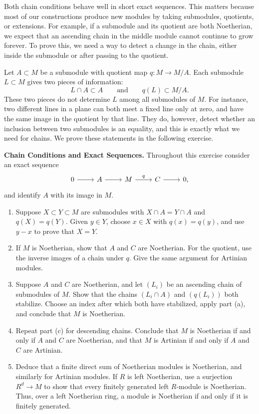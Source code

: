 \documentclass[12pt,reqno]{amsart}
\begin{document}
\hrulefill

Both chain conditions behave well in short exact sequences. This matters because most of our constructions produce new modules by taking submodules, quotients, or extensions. For example, if a submodule and its quotient are both Noetherian, we expect that an ascending chain in the middle module cannot continue to grow forever. To prove this, we need a way to detect a change in the chain, either inside the submodule or after passing to the quotient.

Let $A\subset M$ be a submodule with quotient map $q:M\to M/A$. Each submodule $L\subset M$ gives two pieces of information:
\[
L\cap A\subset A\qquad\text{and}\qquad q(L)\subset M/A.
\]
These two pieces do not determine $L$ among all submodules of $M$. For instance, two different lines in a plane can both meet a fixed line only at zero, and have the same image in the quotient by that line. They do, however, detect whether an inclusion between two submodules is an equality, and this is exactly what we need for chains. We prove these statements in the following exercise.

\hrulefill

\begin{problems}
\item\label{c:extensions} \textbf{Chain Conditions and Exact Sequences.} Throughout this exercise consider an exact sequence
\[
\begin{tikzcd}
0 \arrow[r] & A \arrow[r] & M \arrow[r,"q"] & C \arrow[r] & 0,
\end{tikzcd}
\]
and identify $A$ with its image in $M$.
\begin{enumerate}
\item Suppose $X\subset Y\subset M$ are submodules with $X\cap A=Y\cap A$ and $q(X)=q(Y)$. Given $y\in Y$, choose $x\in X$ with $q(x)=q(y)$, and use $y-x$ to prove that $X=Y$.
\item If $M$ is Noetherian, show that $A$ and $C$ are Noetherian. For the quotient, use the inverse images of a chain under $q$. Give the same argument for Artinian modules.
\item Suppose $A$ and $C$ are Noetherian, and let $(L_i)$ be an ascending chain of submodules of $M$. Show that the chains $(L_i\cap A)$ and $(q(L_i))$ both stabilize. Choose an index after which both have stabilized, apply part (a), and conclude that $M$ is Noetherian.
\item Repeat part (c) for descending chains. Conclude that $M$ is Noetherian if and only if $A$ and $C$ are Noetherian, and that $M$ is Artinian if and only if $A$ and $C$ are Artinian.
\item Deduce that a finite direct sum of Noetherian modules is Noetherian, and similarly for Artinian modules. If $R$ is left Noetherian, use a surjection $R^d\to M$ to show that every finitely generated left $R$-module is Noetherian. Thus, over a left Noetherian ring, a module is Noetherian if and only if it is finitely generated.
\end{enumerate}
\end{problems}
\end{document}
